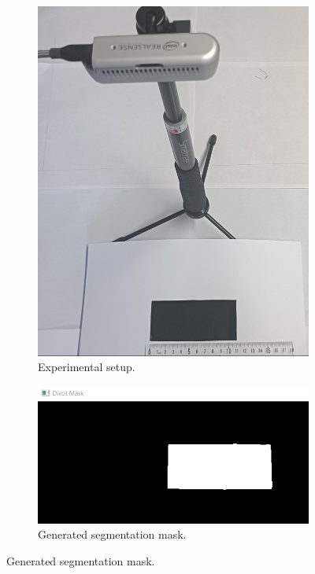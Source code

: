 \begin{figure}[h!]
    \centering
    \begin{subfigure}[b]{0.49\textwidth}
        \centering
        \includegraphics[width=0.8\linewidth]{figures/volume_test_setup.png} %
        \caption{Experimental setup.}
        \label{fig:volume_test_setup_img}
    \end{subfigure}
    \hfill
    \begin{subfigure}[b]{0.49\textwidth}
        \centering
        \includegraphics[width=0.8\linewidth]{figures/divot_mask.PNG} %
        \caption{Generated segmentation mask.}
        \label{fig:divot_mask_img}
    \end{subfigure}
    

\end{figure}
